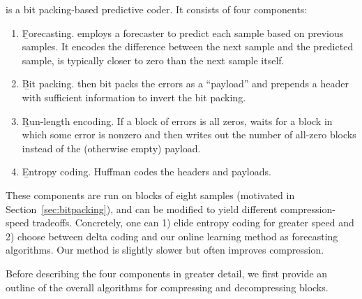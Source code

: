 

\mine is a bit packing-based predictive coder. It consists of four components:
\begin{enumerate}
\itemsep0em
\item \b{Forecasting.} \minesp employs a forecaster to predict each sample based on previous samples. It encodes the difference between the next sample and the predicted sample, is typically closer to zero than the next sample itself.
\item \b{Bit packing.} \minesp then bit packs the errors as a ``payload'' and prepends a header with sufficient information to invert the bit packing.
\item \b{Run-length encoding.} If a block of errors is all zeros, \minesp waits for a block in which some error is nonzero and then writes out the number of all-zero blocks instead of the (otherwise empty) payload.
\item \b{Entropy coding.} \minesp Huffman codes the headers and payloads.
\end{enumerate}

These components are run on blocks of eight samples (motivated in Section~\ref{sec:bitpacking}), and can be modified to yield different compression-speed tradeoffs. Concretely, one can 1) elide entropy coding for greater speed and 2) choose between delta coding and our online learning method as forecasting algorithms. Our method is slightly slower but often improves compression.

Before describing the four components in greater detail, we first provide an outline of the overall algorithms for compressing and decompressing blocks.


\newcommand{\err}{\texttt{err}}
\newcommand{\nbits}{\texttt{nbits}}
\newcommand{\packed}{\texttt{packed}}
\newcommand{\buff}{$\texttt{buff}$}
\newcommand{\bytes}{\texttt{bytes}}
\newcommand{\payload}{\texttt{payload}}
\newcommand{\f}{\texttt{f}}
\newcommand{\fore}{\texttt{forecaster}}
\newcommand{\self}{\texttt{self}}


